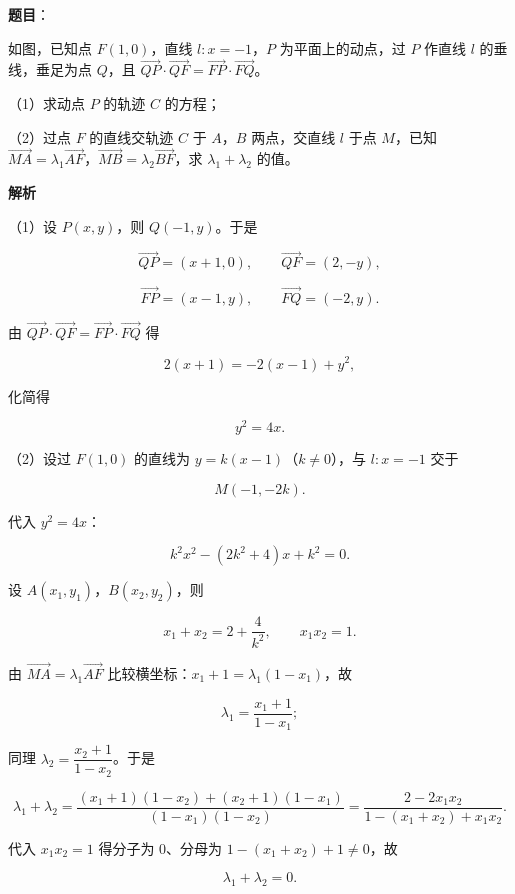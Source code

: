 \begin{answer}

\textbf{题目}：

如图，已知点 $F(1,0)$，直线 $l:x=-1$，$P$ 为平面上的动点，过 $P$ 作直线 $l$ 的垂线，垂足为点 $Q$，且 $\overrightarrow{QP}\cdot\overrightarrow{QF}=\overrightarrow{FP}\cdot\overrightarrow{FQ}$。

（1）求动点 $P$ 的轨迹 $C$ 的方程；

（2）过点 $F$ 的直线交轨迹 $C$ 于 $A$，$B$ 两点，交直线 $l$ 于点 $M$，已知 $\overrightarrow{MA}=\lambda_1\overrightarrow{AF}$，$\overrightarrow{MB}=\lambda_2\overrightarrow{BF}$，求 $\lambda_1+\lambda_2$ 的值。
\nopagebreak[4]
\begin{center}\end{center}
\nopagebreak[4]
\textbf{解析}

（1）设 $P(x,y)$，则 $Q(-1,y)$。于是

\nopagebreak[4]
\[\overrightarrow{QP}=(x+1,0),\qquad \overrightarrow{QF}=(2,-y),\]

\nopagebreak[4]
\[\overrightarrow{FP}=(x-1,y),\qquad \overrightarrow{FQ}=(-2,y).\]

由 $\overrightarrow{QP}\cdot\overrightarrow{QF}=\overrightarrow{FP}\cdot\overrightarrow{FQ}$ 得

\nopagebreak[4]
\[2(x+1)=-2(x-1)+y^2,\]

化简得

\nopagebreak[4]
\[y^2=4x.\]

（2）设过 $F(1,0)$ 的直线为 $y=k(x-1)$（$k\neq0$），与 $l:x=-1$ 交于

\nopagebreak[4]
\[M(-1,-2k).\]

代入 $y^2=4x$：

\nopagebreak[4]
\[k^2x^2-(2k^2+4)x+k^2=0.\]

设 $A(x_1,y_1)$，$B(x_2,y_2)$，则

\nopagebreak[4]
\[x_1+x_2=2+\frac4{k^2},\qquad x_1x_2=1.\]

由 $\overrightarrow{MA}=\lambda_1\overrightarrow{AF}$ 比较横坐标：$x_1+1=\lambda_1(1-x_1)$，故

\nopagebreak[4]
\[\lambda_1=\frac{x_1+1}{1-x_1};\]

同理 $\lambda_2=\dfrac{x_2+1}{1-x_2}$。于是

\nopagebreak[4]
\[\lambda_1+\lambda_2=\frac{(x_1+1)(1-x_2)+(x_2+1)(1-x_1)}{(1-x_1)(1-x_2)}=\frac{2-2x_1x_2}{1-(x_1+x_2)+x_1x_2}.\]

代入 $x_1x_2=1$ 得分子为 $0$、分母为 $1-(x_1+x_2)+1\neq0$，故

\nopagebreak[4]
\[\lambda_1+\lambda_2=0.\]


\end{answer}

